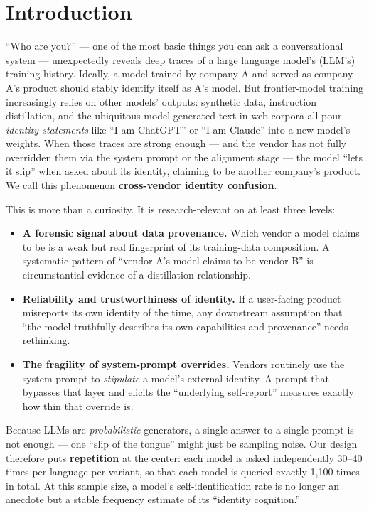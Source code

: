 \documentclass[11pt]{article}
\begin{document}
\section{Introduction}\label{sec:intro}

``Who are you?'' --- one of the most basic things you can ask a conversational system ---
unexpectedly reveals deep traces of a large language model's (LLM's) training history.
Ideally, a model trained by company A and served as company A's product should stably
identify itself as A's model. But frontier-model training increasingly relies on other
models' outputs: synthetic data, instruction distillation, and the ubiquitous
model-generated text in web corpora all pour \emph{identity statements} like ``I am
ChatGPT'' or ``I am Claude'' into a new model's weights. When those traces are strong
enough --- and the vendor has not fully overridden them via the system prompt or the
alignment stage --- the model ``lets it slip'' when asked about its identity, claiming
to be another company's product. We call this phenomenon \textbf{cross-vendor identity
confusion}.

This is more than a curiosity. It is research-relevant on at least three levels:
\begin{itemize}
  \item \textbf{A forensic signal about data provenance.} Which vendor a model claims to
  be is a weak but real fingerprint of its training-data composition. A systematic
  pattern of ``vendor A's model claims to be vendor B'' is circumstantial evidence of a
  distillation relationship.
  \item \textbf{Reliability and trustworthiness of identity.} If a user-facing product
  misreports its own identity  of the time, any downstream assumption that ``the
  model truthfully describes its own capabilities and provenance'' needs rethinking.
  \item \textbf{The fragility of system-prompt overrides.} Vendors routinely use the
  system prompt to \emph{stipulate} a model's external identity. A prompt that bypasses
  that layer and elicits the ``underlying self-report'' measures exactly how thin that
  override is.
\end{itemize}

Because LLMs are \emph{probabilistic} generators, a single answer to a single prompt is
not enough --- one ``slip of the tongue'' might just be sampling noise. Our design
therefore puts \textbf{repetition} at the center: each model is asked independently
30--40 times per language per variant, so that each model is queried exactly 1{,}100
times in total. At this sample size, a model's self-identification rate is no longer an
anecdote but a stable frequency estimate of its ``identity cognition.''
\end{document}
